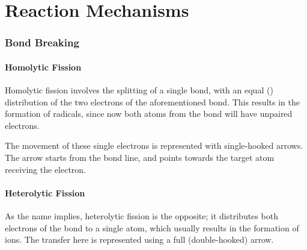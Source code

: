 

\pagebreak
\hypertarget{ChapterReactionMechanisms}{}
\part{Reaction Mechanisms}

	\section{Bond Breaking}
		\subsection{Homolytic Fission}

			Homolytic fission involves the splitting of a single bond, with an equal () distribution of the two electrons
			of the aforementioned bond. This results in the formation of radicals, since now both atoms from the bond will have
			unpaired electrons.

			The movement of these single electrons is represented with single-hooked arrows. The arrow starts from the bond line, and points
			towards the target atom receiving the electron.



		\subsection{Heterolytic Fission}

			As the name implies, heterolytic fission is the opposite; it distributes both electrons of the bond to a single atom, which
			usually results in the formation of ions. The transfer here is represented using a full (double-hooked) arrow.


